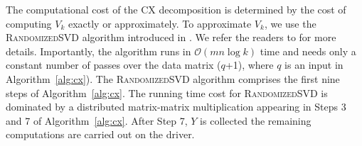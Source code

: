 
The computational cost of the CX decomposition is determined by the cost of computing $V_k$ exactly or approximately. To approximate $V_k$, we use the \textsc{RandomizedSVD} algorithm introduced in \cite{MRT06,MRT11}. We refer the readers to \cite{HMT09_SIREV,Mah-mat-rev_BOOK} for more details. Importantly, the algorithm runs in $\mathcal{O}(mn \log k)$ time and needs only a constant number of passes over the data matrix ($q$+1), where $q$ is an input in Algorithm~\ref{alg:cx}).  The \textsc{RandomizedSVD} algorithm comprises the first nine steps of Algorithm~\ref{alg:cx}. The running time cost for \textsc{RandomizedSVD} is dominated by a distributed matrix-matrix multiplication appearing in Steps 3 and 7 of Algorithm~\ref{alg:cx}. After Step 7, $Y$ is collected the remaining computations are carried out on the driver.

